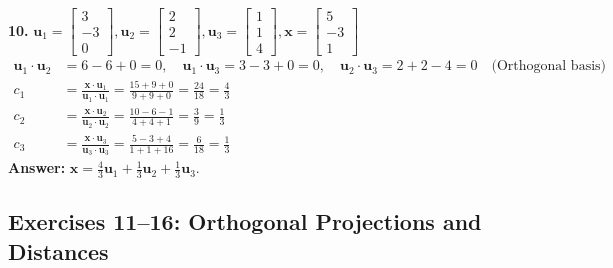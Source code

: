 \documentclass[11pt, letterpaper]{article}
\theoremstyle{definition}
\theoremstyle{remark}
\begin{document}
\textbf{10.} $\mathbf{u}_1 = \begin{bmatrix} 3 \\ -3 \\ 0 \end{bmatrix}, \mathbf{u}_2 = \begin{bmatrix} 2 \\ 2 \\ -1 \end{bmatrix}, \mathbf{u}_3 = \begin{bmatrix} 1 \\ 1 \\ 4 \end{bmatrix}, \mathbf{x} = \begin{bmatrix} 5 \\ -3 \\ 1 \end{bmatrix}$
\begin{align*}
    \mathbf{u}_1 \cdot \mathbf{u}_2 &= 6 - 6 + 0 = 0, \quad \mathbf{u}_1 \cdot \mathbf{u}_3 = 3 - 3 + 0 = 0, \quad \mathbf{u}_2 \cdot \mathbf{u}_3 = 2 + 2 - 4 = 0 \quad \text{(Orthogonal basis)} \\
    c_1 &= \frac{\mathbf{x} \cdot \mathbf{u}_1}{\mathbf{u}_1 \cdot \mathbf{u}_1} = \frac{15 + 9 + 0}{9 + 9 + 0} = \frac{24}{18} = \frac{4}{3} \\
    c_2 &= \frac{\mathbf{x} \cdot \mathbf{u}_2}{\mathbf{u}_2 \cdot \mathbf{u}_2} = \frac{10 - 6 - 1}{4 + 4 + 1} = \frac{3}{9} = \frac{1}{3} \\
    c_3 &= \frac{\mathbf{x} \cdot \mathbf{u}_3}{\mathbf{u}_3 \cdot \mathbf{u}_3} = \frac{5 - 3 + 4}{1 + 1 + 16} = \frac{6}{18} = \frac{1}{3}
\end{align*}
\textbf{Answer:} $\mathbf{x} = \frac{4}{3}\mathbf{u}_1 + \frac{1}{3}\mathbf{u}_2 + \frac{1}{3}\mathbf{u}_3$.

\subsection{Exercises 11--16: Orthogonal Projections and Distances}
\end{document}
